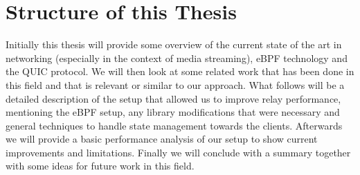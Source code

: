 \section{Structure of this Thesis}\label{sec:structure_of_thesis}

Initially this thesis will provide some overview of the current state of the art in networking (especially in the context of media streaming), 
eBPF technology and the QUIC protocol.
We will then look at some related work that has been done in this field and that is relevant or similar to our approach.
What follows will be a detailed description of the setup that allowed us to improve relay performance, mentioning the 
eBPF setup, any library modifications that were necessary and general techniques to handle state management towards the 
clients.
Afterwards we will provide a basic performance analysis of our setup to show current improvements and limitations.
Finally we will conclude with a summary together with some ideas for future work in this field.